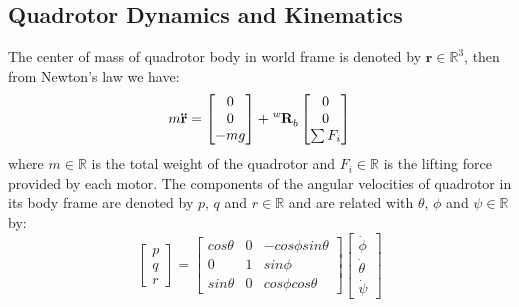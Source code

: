 \subsection{Quadrotor Dynamics and Kinematics}

The center of mass of quadrotor body in world frame is denoted by $\mathbf{r}\in\mathbb{R}^3$, then from Newton's law we have:
\begin{equation}\label{eq:newton}
m\mathbf{\ddot{r}}=\begin{bmatrix}0\\0\\-mg\end{bmatrix}+\tensor*[^w]{\mathbf{R}}{_b}\begin{bmatrix}0\\0\\\sum F_i\end{bmatrix}
\end{equation}
where $\mathit{m}\in\mathbb{R}$ is the total weight of the quadrotor and $\mathit{F_i}\in\mathbb{R}$ is the lifting force provided by each motor. The components of the angular velocities of quadrotor in its body frame are denoted by $\mathit{p}$, $\mathit{q}$ and $\mathit{r}\in\mathbb{R}$ and are related with $\theta$, $\phi$ and $\psi\in\mathbb{R}$ by:
\begin{equation}\label{eq:pqr}
\begin{bmatrix}p\\q\\r\end{bmatrix}=\begin{bmatrix}cos\theta&0&-cos\phi sin\theta\\0&1&sin\phi\\sin\theta&0&cos\phi cos\theta\end{bmatrix}\begin{bmatrix}\dot{\phi}\\\dot{\theta}\\\dot{\psi}\end{bmatrix}
\end{equation}


